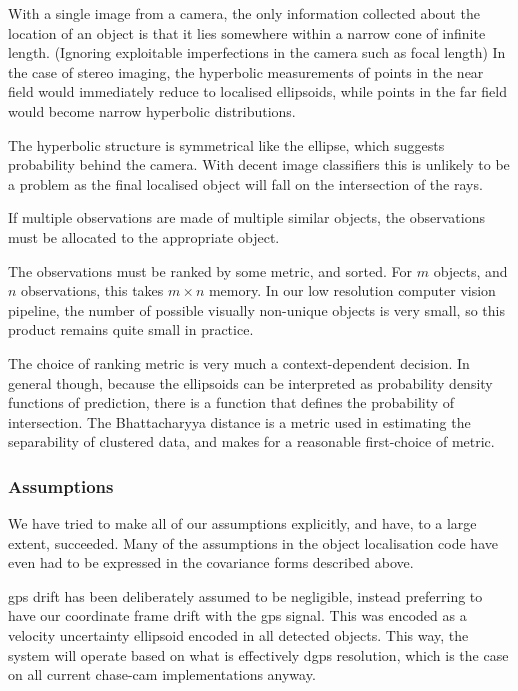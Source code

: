 \documentclass[a4paper, 11pt, titlepage]{article}
\newcounter{subsubsubsection}[subsubsection]
\begin{document}
        With a single image from a camera, the only information collected about the location of an object is that it lies somewhere within a narrow cone of infinite length.  (Ignoring exploitable imperfections in the camera such as focal length)
        In the case of stereo imaging, the hyperbolic measurements of points in the near field would immediately reduce to localised ellipsoids, while points in the far field would become narrow hyperbolic distributions.

        The hyperbolic structure is symmetrical like the ellipse, which suggests probability behind the camera.  With decent image classifiers this is unlikely to be a problem as the final localised object will fall on the intersection of the rays.

        If multiple observations are made of multiple similar objects, the observations must be allocated to the appropriate object.

        The observations must be ranked by some metric, and sorted.  For \(m\) objects, and \(n\) observations, this takes \(m \times n\) memory.  In our low resolution computer vision pipeline, the number of possible visually non-unique objects is very small, so this product remains quite small in practice.

        The choice of ranking metric is very much a context-dependent decision.  In general though, because the ellipsoids can be interpreted as probability density functions of prediction, there is a function that defines the probability of intersection. The Bhattacharyya distance is a metric used in estimating the separability of clustered data, and makes for a reasonable first-choice of metric.

    \subsubsection{Assumptions}
      We have tried to make all of our assumptions explicitly, and have, to a large extent, succeeded.
      Many of the assumptions in the object localisation code have even had to be expressed in the covariance forms described above.

      \gls{gps} drift has been deliberately assumed to be negligible, instead preferring to have our coordinate frame drift with the \gls{gps} signal.  This was encoded as a velocity uncertainty ellipsoid encoded in all detected objects.
      This way, the system will operate based on what is effectively \gls{dgps} resolution, which is the case on all current chase-cam implementations anyway.
\end{document}
